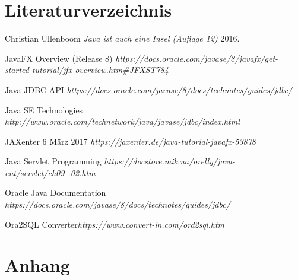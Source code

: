 \documentclass[a4paper, 12.5pt]{scrartcl}
\begin{document}
\section{Literaturverzeichnis}
\begin{thebibliography}{1}

   Christian Ullenboom {\em Java ist auch eine Insel (Auflage 12)} 2016.

JavaFX Overview (Release 8) {\em https://docs.oracle.com/javase/8/javafx/get-started-tutorial/jfx-overview.htm\#JFXST784}

Java JDBC API {\em https://docs.oracle.com/javase/8/docs/technotes/guides/jdbc/}

Java SE Technologies {\em http://www.oracle.com/technetwork/java/javase/jdbc/index.html}

JAXenter 6 März 2017 {\em https://jaxenter.de/java-tutorial-javafx-53878}

Java Servlet Programming {\em https://docstore.mik.ua/orelly/java-ent/servlet/ch09\_02.htm}

Oracle Java Documentation {\em https://docs.oracle.com/javase/8/docs/technotes/guides/jdbc/}

Ora2SQL Converter{\em https://www.convert-in.com/ord2sql.htm}

\end{thebibliography}

\section{Anhang}
\end{document}

